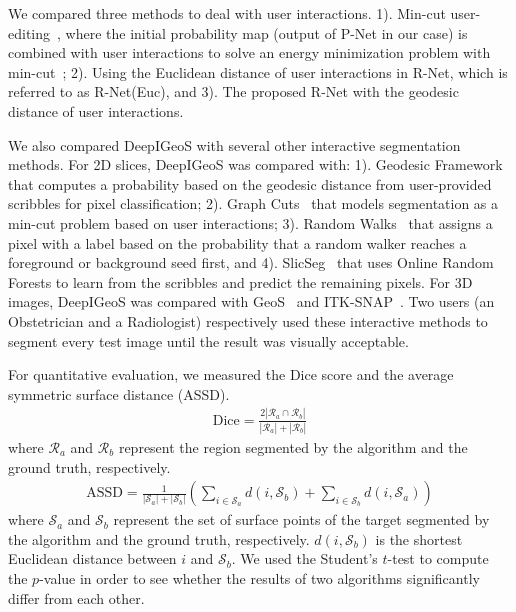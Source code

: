 \documentclass[10pt,journal,compsoc]{IEEEtran}
\begin{document}
We compared three methods to deal with user interactions. 1). Min-cut user-editing~\cite{Rother2004}, where the initial probability map (output of P-Net in our case) is combined with user interactions to solve an energy minimization problem with min-cut~\cite{Boykov2001}; 2). Using the Euclidean distance of user interactions in R-Net, which is referred to as R-Net(Euc), and 3). The proposed R-Net with the geodesic distance of user interactions.  

We also compared DeepIGeoS with several other interactive segmentation methods. For 2D slices, DeepIGeoS was compared with: 1). Geodesic Framework~\cite{Bai2007} that computes a probability based on the geodesic distance from user-provided scribbles for pixel classification; 2). Graph Cuts~\cite{Boykov2001} that models segmentation as a min-cut problem based on user interactions; 3). Random Walks~\cite{Grady2006a} that assigns a pixel with a label based on the probability that a random walker reaches a foreground or background seed first, and 4). SlicSeg~\cite{Wang2016} that uses Online Random Forests to learn from the scribbles and predict the remaining pixels. For 3D images, DeepIGeoS was compared with GeoS~\cite{Criminisi2008} and ITK-SNAP~\cite{Yushkevich2006}. Two users (an Obstetrician and a Radiologist) %
respectively used these interactive methods to segment every test image until the result was visually acceptable.

For quantitative evaluation, we measured the Dice score and the average symmetric surface distance (ASSD).  
\begin{align}
\text{Dice}=\frac{2|\mathcal{R}_a\cap \mathcal{R}_b|}{|\mathcal{R}_a|+|\mathcal{R}_b|}
\end{align} 
where $\mathcal{R}_a$ and $\mathcal{R}_b$ represent the region segmented by the algorithm and the ground truth, respectively.
\begin{align}
\text{ASSD}=\frac{1}{|\mathcal{S}_a|+|\mathcal{S}_b|}
\left(
\sum_{i\in \mathcal{S}_a}d(i,\mathcal{S}_b)+\sum_{i\in \mathcal{S}_b}
d(i,\mathcal{S}_a)
\right)
\label{eq:assd}
\end{align} 
where $\mathcal{S}_a$ and $\mathcal{S}_b$ represent the set of surface points of the target segmented by the algorithm and the ground truth, respectively. $d(i,\mathcal{S}_b)$ is the shortest Euclidean distance between $i$ and $\mathcal{S}_b$. We used the Student's $t$-test to compute the $p$-value in order to see whether the results of two algorithms significantly differ from each other. 
\end{document}
